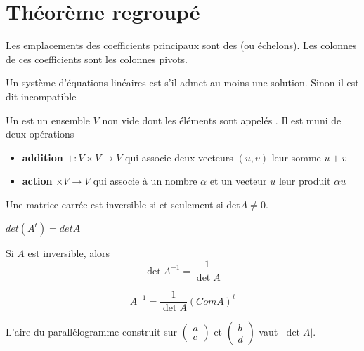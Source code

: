 \chapter{Théorème regroupé}
    
    \begin{definition}
        Les emplacements des coefficients principaux sont des  (ou échelons). Les colonnes de ces coefficients sont les colonnes pivots.
    \end{definition}
    \begin{definition}
        Un système d'équations linéaires est  s'il admet au moins une solution. Sinon il est dit incompatible
    \end{definition}
        \begin{definition}
        Un  est un ensemble $V$ non vide dont les éléments sont appelés . Il est muni de deux opérations
        \begin{itemize}
            \item \textbf{addition} $+ : V \times V \to V$ qui associe deux vecteurs $(u, v)$ leur somme $u + v$
            \item \textbf{action} \R$ \times V \to V$ qui associe à un nombre $\alpha$ et un vecteur $u$ leur produit $\alpha u$
        \end{itemize}
    \end{definition}
     \begin{theoreme}
        Une matrice carrée est inversible si et seulement si det$A \neq 0$.
    \end{theoreme}
        \begin{theoreme}
        $det(A^t) = detA$
    \end{theoreme}
        \begin{corollaire}
       Si $A$ est inversible, alors
       \[\det A^{-1} = \frac{1}{\det A}\]
    \end{corollaire} 
    \begin{definition}
    \begin{equation*}
        A^{-1} = \frac{1}{\det A}(ComA)^t
    \end{equation*}
\end{definition}
\begin{theorem}
    L'aire du parallélogramme construit sur $\begin{pmatrix} a \\ c \end{pmatrix}$ et $\begin{pmatrix} b \\ d \end{pmatrix}$ vaut $|\det A|$.
\end{theorem}
